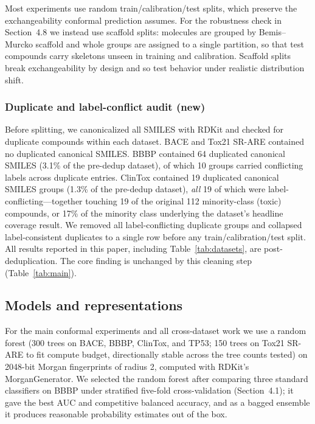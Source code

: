 \documentclass[11pt]{article}
\begin{document}
Most experiments use random train/calibration/test splits, which preserve the exchangeability
conformal prediction assumes. For the robustness check in Section~4.8 we instead use scaffold
splits: molecules are grouped by Bemis--Murcko scaffold \cite{bemis1996} and whole groups are
assigned to a single partition, so that test compounds carry skeletons unseen in training and
calibration. Scaffold splits break exchangeability by design and so test behavior under realistic
distribution shift.

\subsubsection{Duplicate and label-conflict audit (new)}

Before splitting, we canonicalized all SMILES with RDKit and checked for duplicate compounds within
each dataset. BACE and Tox21 SR-ARE contained no duplicated canonical SMILES. BBBP contained 64
duplicated canonical SMILES (3.1\% of the pre-dedup dataset), of which 10 groups carried
conflicting labels across duplicate entries. ClinTox contained 19 duplicated canonical SMILES
groups (1.3\% of the pre-dedup dataset), \emph{all} 19 of which were label-conflicting---together
touching 19 of the original 112 minority-class (toxic) compounds, or 17\% of the minority class
underlying the dataset's headline coverage result. We removed all label-conflicting duplicate
groups and collapsed label-consistent duplicates to a single row before any train/calibration/test
split. All results reported in this paper, including Table~\ref{tab:datasets}, are
post-deduplication. The core finding is unchanged by this cleaning step (Table~\ref{tab:main}).

\subsection{Models and representations}

For the main conformal experiments and all cross-dataset work we use a random forest
\cite{breiman2001} (300 trees on BACE, BBBP, ClinTox, and TP53; 150 trees on Tox21 SR-ARE to fit
compute budget, directionally stable across the tree counts tested) on 2048-bit Morgan fingerprints
of radius 2, computed with RDKit's MorganGenerator. We selected the random forest after comparing
three standard classifiers on BBBP under stratified five-fold cross-validation (Section~4.1); it
gave the best AUC and competitive balanced accuracy, and as a bagged ensemble it produces
reasonable probability estimates out of the box.
\end{document}
